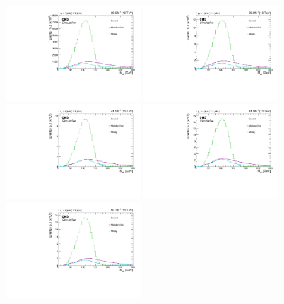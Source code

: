 \begin{figure}[p]
    \centering
    \includegraphics[width=0.45\textwidth]{figure/bbSep_16_el_Optimisation_chi2_20_bbSep.pdf}
    \includegraphics[width=0.45\textwidth]{figure/bbSep_16_mu_Optimisation_chi2_20_bbSep.pdf}
    \includegraphics[width=0.45\textwidth]{figure/bbSep_17_el_Optimisation_chi2_20_bbSep.pdf}
    \includegraphics[width=0.45\textwidth]{figure/bbSep_17_mu_Optimisation_chi2_20_bbSep.pdf}
    \includegraphics[width=0.45\textwidth]{figure/bbSep_18_el_Optimisation_chi2_20_bbSep.pdf}

\end{figure}
